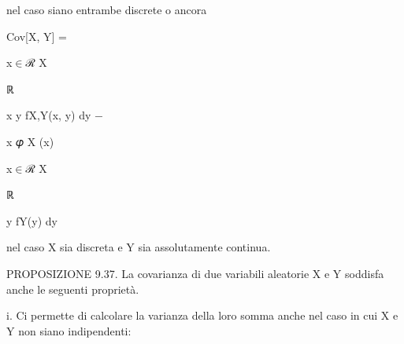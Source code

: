 \documentclass[a4paper,portrait,12pt]{article}
\begin{document}
\begin{flushleft}
nel caso siano entrambe discrete o ancora
\end{flushleft}


\begin{flushleft}
Cov[X, Y] =
\end{flushleft}


\begin{flushleft}
x$\in$ℛ X
\end{flushleft}





\begin{flushleft}
ℝ
\end{flushleft}





\begin{flushleft}
x y fX,Y(x, y) dy $-$
\end{flushleft}





\begin{flushleft}
x 𝜑 X (x)
\end{flushleft}


\begin{flushleft}
x$\in$ℛ X
\end{flushleft}





\begin{flushleft}
ℝ
\end{flushleft}





\begin{flushleft}
y fY(y) dy
\end{flushleft}





\begin{flushleft}
nel caso X sia discreta e Y sia assolutamente continua.
\end{flushleft}


\begin{flushleft}
PROPOSIZIONE 9.37. La covarianza di due variabili aleatorie X e Y soddisfa anche le seguenti propriet\`{a}.
\end{flushleft}


\begin{flushleft}
i. Ci permette di calcolare la varianza della loro somma anche nel caso in cui X e Y non siano indipendenti:
\end{flushleft}
\end{document}
